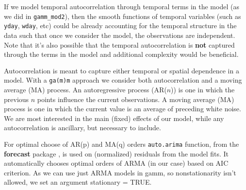 \documentclass[
]{book}
\newenvironment{Shaded}{\begin{snugshade}}{\end{snugshade}}
\newcommand{\AttributeTok}[1]{\textcolor[rgb]{0.77,0.63,0.00}{#1}}
\newcommand{\CommentTok}[1]{\textcolor[rgb]{0.56,0.35,0.01}{\textit{#1}}}
\newcommand{\ConstantTok}[1]{\textcolor[rgb]{0.00,0.00,0.00}{#1}}
\newcommand{\DocumentationTok}[1]{\textcolor[rgb]{0.56,0.35,0.01}{\textbf{\textit{#1}}}}
\newcommand{\FunctionTok}[1]{\textcolor[rgb]{0.00,0.00,0.00}{#1}}
\newcommand{\NormalTok}[1]{#1}
\newcommand{\OtherTok}[1]{\textcolor[rgb]{0.56,0.35,0.01}{#1}}
\newcommand{\SpecialCharTok}[1]{\textcolor[rgb]{0.00,0.00,0.00}{#1}}
\newcommand{\StringTok}[1]{\textcolor[rgb]{0.31,0.60,0.02}{#1}}
\begin{document}
If we model temporal autocorrelation through temporal terms in the model (as we did in \texttt{gamm\_mod2}), then the smooth functions of temporal variables (such as \texttt{yday}, \texttt{wday}, etc) could be already accounting for the temporal structure in the data such that once we consider the model, the observations are independent. Note that it's also possible that the temporal autocorrelation is \textbf{not} captured through the terms in the model and additional complexity would be beneficial.

Autocorrelation is meant to capture either temporal or spatial dependence in a model. With a \texttt{ga(m)m} approach we consider both autocorrelation and a moving average (MA) process. An autoregressive process (AR(\(n\))) is one in which the previous \(n\) points influence the current observations. A moving average (MA) process is one in which the current value is an average of preceding white noise. We are most interested in the main (fixed) effects of our model, while any autocorrelation is ancillary, but necessary to include.

For optimal choose of AR(p) and MA(q) orders \texttt{auto.arima} function, from the \textbf{forecast} package \citep[\citet{R-forecast2}]{R-forecast}, is used on (normalized) residuals from the model fits. It automatically chooses optimal orders of ARMA (in our case) based on AIC criterion. As we can use just ARMA models in gamm, so nonstationarity isn't allowed, we set an argument stationary = TRUE.

\begin{Shaded}
\end{Shaded}
\end{document}
